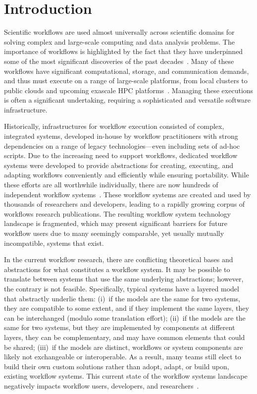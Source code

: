 \section{Introduction}

Scientific workflows are used almost universally across scientific domains for solving complex and large-scale computing and data analysis problems. The importance of workflows is highlighted by the fact that they have underpinned some of the most significant discoveries of the past decades~\cite{badia2017workflows}. Many of these workflows have significant computational, storage, and communication demands, and thus must execute on a range of large-scale platforms, from local clusters to public clouds and upcoming exascale HPC platforms~\cite{ferreiradasilva-fgcs-2017}. Managing these executions is often a significant undertaking, requiring a sophisticated and versatile software infrastructure. 

Historically, infrastructures for workflow execution consisted of complex, integrated systems, developed in-house by workflow practitioners with strong dependencies on a range of legacy technologies---even including sets of ad-hoc scripts. Due to the increasing need to support workflows, dedicated workflow systems were developed to provide abstractions for creating, executing, and adapting workflows conveniently and efficiently while ensuring portability.  While these efforts are all worthwhile individually, there are now hundreds of independent workflow systems~\cite{workflow-systems}. These workflow systems are created and used by thousands of researchers and developers, leading to a rapidly growing corpus of workflows research publications. The resulting workflow system technology landscape is fragmented, which may present significant barriers for future workflow users due to many seemingly comparable, yet usually mutually incompatible, systems that exist. 



In the current workflow research, there are conflicting theoretical bases and abstractions for what constitutes a workflow system. It may be possible to translate between systems that use the same underlying abstractions; however, the contrary is not feasible. Specifically, typical systems have a layered model that abstractly underlie them: (i)~if the models are the same for two systems, they are compatible to some extent, and if they implement the same layers, they can be interchanged (modulo some translation effort); (ii)~if the models are the same for two systems, but they are implemented by components at different layers, they can be complementary, and may have common elements that could be shared; (iii)~if the models are distinct, workflows or system components are likely not exchangeable or interoperable. As a result, many teams still elect to build their own custom solutions rather than adopt, adapt, or build upon, existing workflow systems. This current state of the workflow systems landscape negatively impacts workflow users, developers, and researchers~\cite{deelman2018future}.


